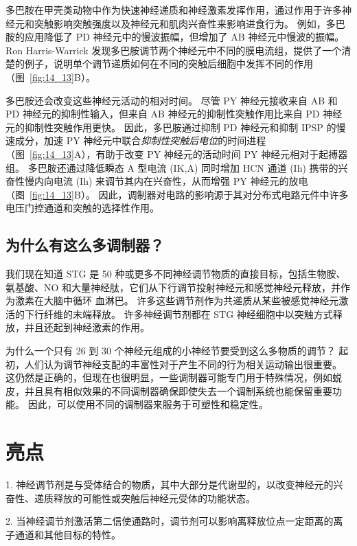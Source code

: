 多巴胺在甲壳类动物中作为快速神经递质和神经激素发挥作用，通过作用于许多神经元和突触影响突触强度以及神经元和肌肉兴奋性来影响进食行为。
例如，多巴胺的应用降低了 PD 神经元中的慢波振幅，但增加了 AB 神经元中慢波的振幅。
Ron Harris-Warrick 发现多巴胺调节两个神经元中不同的膜电流组，提供了一个清楚的例子，说明单个调节递质如何在不同的突触后细胞中发挥不同的作用（图~\ref{fig:14_13}B）。


多巴胺还会改变这些神经元活动的相对时间。
尽管 PY 神经元接收来自 AB 和 PD 神经元的抑制性输入，但来自 AB 神经元的抑制性突触作用比来自 PD 神经元的抑制性突触作用更快。
因此，多巴胺通过抑制 PD 神经元和抑制 IPSP 的慢速成分，加速 PY 神经元中联合\textit{抑制性突触后电位}的时间进程（图~\ref{fig:14_13}A），有助于改变 PY 神经元的活动时间 PY 神经元相对于起搏器组。
多巴胺还通过降低瞬态 A 型电流 (IK,A) 同时增加 HCN 通道 (Ih) 携带的兴奋性慢内向电流 (Ih) 来调节其内在兴奋性，从而增强 PY 神经元的放电（图~\ref{fig:14_13}B）。
因此，调制器对电路的影响源于其对分布式电路元件中许多电压门控通道和突触的选择性作用。



\subsection{为什么有这么多调制器？}

我们现在知道 STG 是 50 种或更多不同神经调节物质的直接目标，包括生物胺、氨基酸、NO 和大量神经肽，它们从下行调节投射神经元和感觉神经元释放，并作为激素在大脑中循环 血淋巴。
许多这些调节剂作为共递质从某些被感觉神经元激活的下行纤维的末端释放。
许多神经调节剂都在 STG 神经细胞中以突触方式释放，并且还起到神经激素的作用。


为什么一个只有 26 到 30 个神经元组成的小神经节要受到这么多物质的调节？
起初，人们认为调节神经支配的丰富性对于产生不同的行为相关运动输出很重要。
这仍然是正确的，但现在也很明显，一些调制器可能专门用于特殊情况，例如蜕皮，并且具有相似效果的不同调制器确保即使失去一个调制系统也能保留重要功能。
因此，可以使用不同的调制器来服务于可塑性和稳定性。



\section{亮点}

1. 神经调节剂是与受体结合的物质，其中大部分是代谢型的，以改变神经元的兴奋性、递质释放的可能性或突触后神经元受体的功能状态。


2. 当神经调节剂激活第二信使通路时，调节剂可以影响离释放位点一定距离的离子通道和其他目标的特性。


